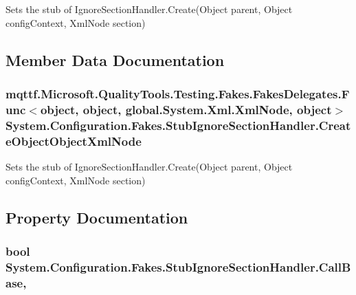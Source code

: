 Sets the stub of Ignore\-Section\-Handler.\-Create(\-Object parent, Object config\-Context, Xml\-Node section)



\subsection{Member Data Documentation}
\hypertarget{class_system_1_1_configuration_1_1_fakes_1_1_stub_ignore_section_handler_af25c1d37555dcd10b7d71b8c3177b1cc}{
\subsubsection[{Create\-Object\-Object\-Xml\-Node}]{\setlength{\rightskip}{0pt plus 5cm}mqttf.\-Microsoft.\-Quality\-Tools.\-Testing.\-Fakes.\-Fakes\-Delegates.\-Func$<$object, object, global.\-System.\-Xml.\-Xml\-Node, object$>$ System.\-Configuration.\-Fakes.\-Stub\-Ignore\-Section\-Handler.\-Create\-Object\-Object\-Xml\-Node}}\label{class_system_1_1_configuration_1_1_fakes_1_1_stub_ignore_section_handler_af25c1d37555dcd10b7d71b8c3177b1cc}


Sets the stub of Ignore\-Section\-Handler.\-Create(\-Object parent, Object config\-Context, Xml\-Node section)



\subsection{Property Documentation}
\hypertarget{class_system_1_1_configuration_1_1_fakes_1_1_stub_ignore_section_handler_a44e35496457f430a82293e098f3216ee}{
\subsubsection[{Call\-Base}]{\setlength{\rightskip}{0pt plus 5cm}bool System.\-Configuration.\-Fakes.\-Stub\-Ignore\-Section\-Handler.\-Call\-Base\hspace{0.3cm}{\ttfamily [get]}, {\ttfamily [set]}}}\label{class_system_1_1_configuration_1_1_fakes_1_1_stub_ignore_section_handler_a44e35496457f430a82293e098f3216ee}


